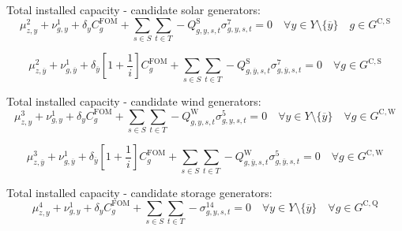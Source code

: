 \documentclass{article}
\newcommand{\sGeneratorsCandidateWind}{G^{\mathrm{C,W}}}
\newcommand{\sGeneratorsCandidateSolar}{G^{\mathrm{C,S}}}
\newcommand{\sStorageCandidate}{G^{\mathrm{C,Q}}}
\newcommand{\sYears}{Y}
\newcommand{\sScenarios}{S}
\newcommand{\sIntervals}{T}
\newcommand{\iGenerator}{g}
\newcommand{\iYear}{y}
\newcommand{\iYearTerminal}{\overline{\iYear}}
\newcommand{\iScenario}{s}
\newcommand{\iInterval}{t}
\newcommand{\iZone}{z}
\newcommand{\cFixedOperationsMaintenanceCostGenerator}[1][\iGenerator]{C^{\mathrm{FOM}}_{#1}}
\newcommand{\cInterestRate}{i}
\newcommand{\cCapacityFactorWind}[1][\iGenerator,\iYear,\iScenario,\iInterval]{Q_{#1}^{\mathrm{W}}}
\newcommand{\cCapacityFactorSolar}[1][\iGenerator,\iYear,\iScenario,\iInterval]{Q_{#1}^{\mathrm{S}}}
\newcommand{\cDiscountRate}[1][\iYear]{\delta_{#1}}
\newcommand{\dSolarBuildLimit}[1][\iZone,\iYear]{\mu_{#1}^{2}}
\newcommand{\dWindBuildLimit}[1][\iZone,\iYear]{\mu_{#1}^{3}}
\newcommand{\dStorageBuildLimit}[1][\iZone,\iYear]{\mu_{#1}^{4}}
\newcommand{\dTotalInstallCapacity}[1][\iGenerator,\iYear]{\nu_{#1}^{1}}
\newcommand{\dMaxPowerOutputWindCandidate}[1][\iGenerator,\iYear,\iScenario,\iInterval]{\sigma_{#1}^{5}}
\newcommand{\dMaxPowerOutputSolarCandidate}[1][\iGenerator,\iYear,\iScenario,\iInterval]{\sigma_{#1}^{7}}
\newcommand{\dMaxDischargingRateCandidate}[1][\iGenerator,\iYear,\iScenario,\iInterval]{\sigma_{#1}^{14}}
\begin{document}
Total installed capacity - candidate solar generators:
\begin{equation}
\dSolarBuildLimit + \dTotalInstallCapacity + \cDiscountRate \cFixedOperationsMaintenanceCostGenerator + \sum\limits_{\iScenario \in \sScenarios}\sum\limits_{\iInterval \in \sIntervals} - \cCapacityFactorSolar \dMaxPowerOutputSolarCandidate = 0 \quad \forall \iYear \in \sYears \setminus \{\iYearTerminal\} \quad \iGenerator \in \sGeneratorsCandidateSolar
\end{equation}

\begin{equation}
\dSolarBuildLimit[\iZone,\iYearTerminal] + \dTotalInstallCapacity[\iGenerator,\iYearTerminal] + \cDiscountRate[\iYearTerminal] \left[1 + \frac{1}{\cInterestRate}\right] \cFixedOperationsMaintenanceCostGenerator + \sum\limits_{\iScenario \in \sScenarios}\sum\limits_{\iInterval \in \sIntervals} - \cCapacityFactorSolar[\iGenerator,\iYearTerminal,\iScenario,\iInterval] \dMaxPowerOutputSolarCandidate[\iGenerator,\iYearTerminal,\iScenario,\iInterval] = 0 \quad \forall \iGenerator \in \sGeneratorsCandidateSolar
\end{equation}

Total installed capacity - candidate wind generators:
\begin{equation}
\dWindBuildLimit + \dTotalInstallCapacity + \cDiscountRate \cFixedOperationsMaintenanceCostGenerator + \sum\limits_{\iScenario \in \sScenarios}\sum\limits_{\iInterval \in \sIntervals} - \cCapacityFactorWind \dMaxPowerOutputWindCandidate = 0 \quad \forall \iYear \in \sYears \setminus \{\iYearTerminal\} \quad \forall \iGenerator \in \sGeneratorsCandidateWind
\end{equation}

\begin{equation}
\dWindBuildLimit[\iZone,\iYearTerminal] + \dTotalInstallCapacity[\iGenerator,\iYearTerminal] + \cDiscountRate[\iYearTerminal] \left[1 + \frac{1}{\cInterestRate}\right] \cFixedOperationsMaintenanceCostGenerator + \sum\limits_{\iScenario \in \sScenarios}\sum\limits_{\iInterval \in \sIntervals} - \cCapacityFactorWind[\iGenerator,\iYearTerminal,\iScenario,\iInterval] \dMaxPowerOutputWindCandidate[\iGenerator,\iYearTerminal,\iScenario,\iInterval] = 0 \quad \forall \iGenerator \in \sGeneratorsCandidateWind
\end{equation}

Total installed capacity - candidate storage generators:
\begin{equation}
\dStorageBuildLimit + \dTotalInstallCapacity + \cDiscountRate \cFixedOperationsMaintenanceCostGenerator + \sum\limits_{\iScenario \in \sScenarios}\sum\limits_{\iInterval \in \sIntervals} - \dMaxDischargingRateCandidate = 0 \quad \forall \iYear \in \sYears \setminus \{\iYearTerminal\} \quad \forall \iGenerator \in \sStorageCandidate
\end{equation}
\end{document}
